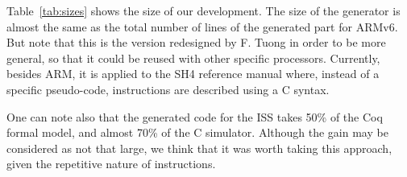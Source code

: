 Table~\ref{tab:sizes} shows the size of our development.
The size of the generator is almost the same as the total
number of lines of the generated part for ARMv6.
But note that this is the version redesigned by F. Tuong
in order to be more general,
so that it could be reused with other specific processors.
Currently, besides ARM, it is applied to the SH4 reference manual
where, instead of a specific pseudo-code,
instructions are described using a C syntax.

One can note also that the generated code for the ISS
takes 50\:\% of the Coq formal model,
and almost 70\:\% of the C simulator.
Although the gain may be considered as not that large,
we think that it was worth taking this approach,
given the repetitive nature of instructions.

